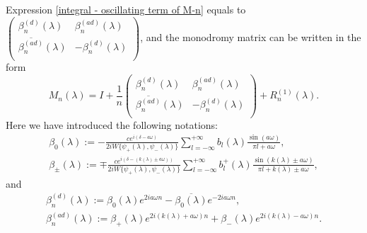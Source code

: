 \documentclass[a4paper,oneside,12pt]{amsart}
\begin{document}
Expression \eqref{integral - oscillating term of M-n} equals to
\linebreak
$\left(\begin{array}{cc}
\beta_n^{(d)}(\lambda) & \beta_n^{(ad)}(\lambda) \\
\overline{\beta_n^{(ad)}}(\lambda) & -\beta_n^{(d)}(\lambda) \\
\end{array}\right)$,
and the monodromy matrix can be written in the form
\begin{equation}\label{M-n final}
    M_n(\lambda)=I+\frac1n
    \left(    \begin{array}{cc}
    \beta_n^{(d)}(\lambda) & \beta_n^{(ad)}(\lambda) \\
    \overline{\beta_n^{(ad)}}(\lambda) & -\beta_n^{(d)}(\lambda) \\
    \end{array}    \right)
    +R_n^{(1)}(\lambda).
\end{equation}
Here we have introduced the following notations:
\begin{equation}\label{beta-0,+,-}
    \begin{array}{l}
    \beta_0(\lambda):=-\frac{ce^{i(\delta-a\omega)}}{2iW\{\psi_+(\lambda),\psi_-(\lambda)\}}\sum\limits_{l=-\infty}^{+\infty}b_l(\lambda)
    \frac{\sin(a\omega)}{\pi l+a\omega},
    \\
    \beta_{\pm}(\lambda):=\mp\frac{ce^{i(\delta-(k(\lambda)\pm a\omega))}}{2iW\{\psi_+(\lambda),\psi_-(\lambda)\}}
    \sum\limits_{l=-\infty}^{+\infty}b^+_l(\lambda)\frac{\sin(k(\lambda)\pm a\omega)}{\pi l+k(\lambda)\pm a\omega},
    \end{array}
\end{equation}
and
\begin{equation}\label{beta-d,ad}
    \begin{array}{l}
    \beta_n^{(d)}(\lambda):=\beta_0(\lambda)e^{2ia\omega n}-\overline{\beta_0(\lambda)}e^{-2ia\omega n},
    \\
    \beta_n^{(ad)}(\lambda):=\beta_+(\lambda)e^{2i(k(\lambda)+a\omega)n}+\beta_-(\lambda)e^{2i(k(\lambda)-a\omega)n}.
    \end{array}
\end{equation}
\end{document}

